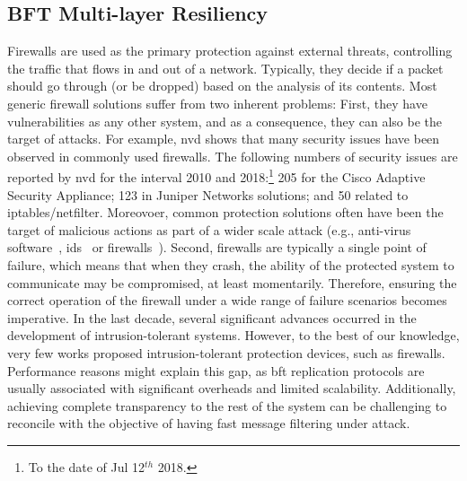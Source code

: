 \subsection{BFT Multi-layer Resiliency} 
Firewalls are used as the primary protection against external threats, controlling the traffic that flows in and out of a network. 
Typically, they decide if a packet should go through (or be dropped) based on the analysis of its contents. 
Most generic firewall solutions suffer from two inherent problems: 
First, they have vulnerabilities as any other system, and as a consequence, they can also be the target of attacks. 
For example, \gls{nvd} shows that many security issues have been observed in commonly used firewalls. 
The following numbers of security issues are reported by \gls{nvd} for the interval 2010 and 2018:\footnote{To the date of Jul 12$^{th}$ 2018.} 205 for the Cisco Adaptive Security Appliance; 123 in Juniper Networks solutions; and 50 related to iptables/netfilter. 
Moreovoer, common protection solutions often have been the target of malicious actions as part of a wider scale attack (e.g., anti-virus software~\cite{Chauhan:2011}, \gls{ids}~\cite{Anderson:2001} or firewalls~\cite{Kamara:2003,Surisetty:2010,cisco1,cisco2}).
Second, firewalls are typically a single point of failure, which means that when they crash, the ability of the protected system to communicate may be compromised, at least momentarily.
Therefore, ensuring the correct operation of the firewall under a wide range of failure scenarios becomes imperative.
In the last decade, several significant advances occurred in the development of intrusion-tolerant systems.
However, to the best of our knowledge, very few works proposed intrusion-tolerant protection devices, such as firewalls.
Performance reasons might explain this gap, as \gls{bft} replication protocols are usually associated with significant overheads and limited scalability.
Additionally, achieving complete transparency to the rest of the system can be challenging to reconcile with the objective of having fast message filtering under attack.

